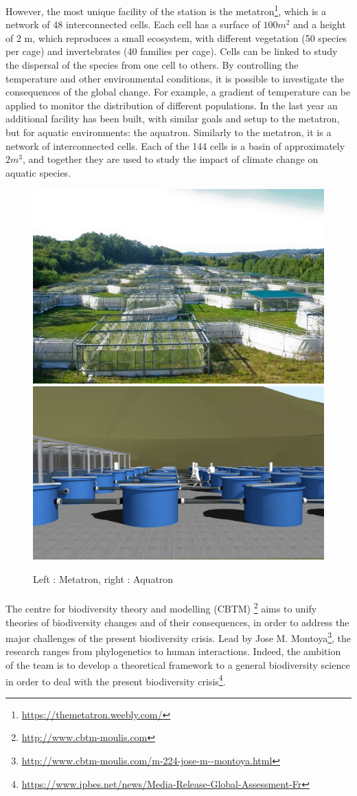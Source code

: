 \documentclass{article}
\begin{document}
However, the most unique facility of the station is the metatron\footnote{\url{https://themetatron.weebly.com/}}, which is a network of 48 interconnected cells. Each cell has a surface of $100m^2$ and a height of 2 m, which reproduces a small ecosystem, with different vegetation (50 species per cage) and invertebrates (40 families per cage). Cells can be linked to study the dispersal of the species from one cell to others. By controlling the temperature and other environmental conditions, it is possible to investigate the consequences of the global change. For example, a gradient of temperature can be applied to monitor the distribution of different populations. In the last year an additional facility has been built, with similar goals and setup to the metatron, but for aquatic environments: the aquatron. Similarly to the metatron, it is a network of interconnected cells. Each of the 144 cells is a basin of approximately $2m^3$, and together they are used to study the impact of climate change on aquatic species.




\begin{figure}[h]
\begin{center}
\includegraphics[width=6.cm]{metatron_0.jpg}
\includegraphics[width=6.cm]{aquatron.png}
\end{center}
\caption{\label{fig:temp}Left : Metatron, right : Aquatron}
\end{figure}



\paragraph{}
The centre for biodiversity theory and modelling (CBTM) \footnote{\url{http://www.cbtm-moulis.com}} aims to unify theories of biodiversity changes and of their consequences, in order to address the major challenges of the present biodiversity crisis. Lead by Jose M. Montoya\footnote{\url{http://www.cbtm-moulis.com/m-224-jose-m--montoya.html}}, the research ranges from phylogenetics to human interactions. Indeed, the ambition of the team is to develop a theoretical framework to a general biodiversity science in order to deal with the present biodiversity crisis\footnote{\url{https://www.ipbes.net/news/Media-Release-Global-Assessment-Fr}}.
\end{document}
